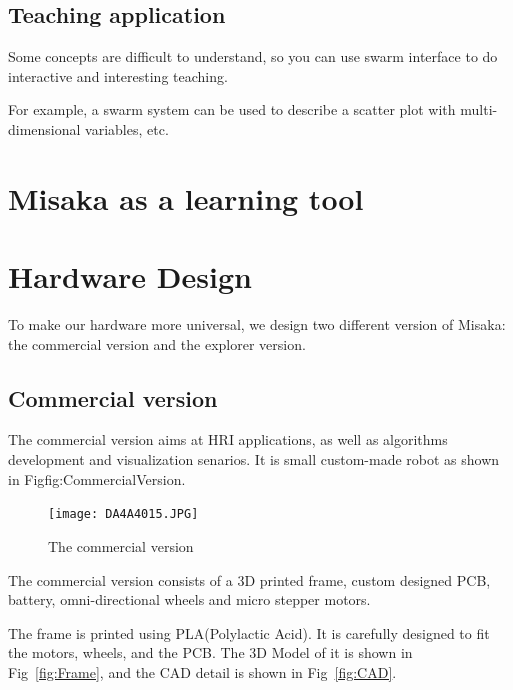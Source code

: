 \documentclass[sigconf]{acmart}
\begin{document}
\subsection{Teaching application}

Some concepts are difficult to understand, so you can use swarm interface to do interactive and interesting teaching.

For example, a swarm system can be used to describe a scatter plot with multi-dimensional variables, etc.

\section{Misaka as a learning tool}

\section{Hardware Design}

To make our hardware more universal, we design two different version of Misaka: the commercial version and the explorer version.

\subsection{Commercial version}

The commercial version aims at HRI applications, as well as algorithms development and visualization senarios. It is small custom-made robot as shown in Fig{fig:CommercialVersion}.

\begin{figure}[h]
  \centering
  \texttt{[image: DA4A4015.JPG]}
  \caption{The commercial version}
  \label{fig:CommercialVersion}
\end{figure}

The commercial version consists of a 3D printed frame, custom designed PCB, battery, omni-directional wheels and micro stepper motors.

The frame is printed using PLA(Polylactic Acid). It is carefully designed to fit the motors, wheels, and the PCB. The 3D Model of it is shown in Fig~\ref{fig:Frame}, and the CAD detail is shown in Fig~\ref{fig:CAD}.
\end{document}
